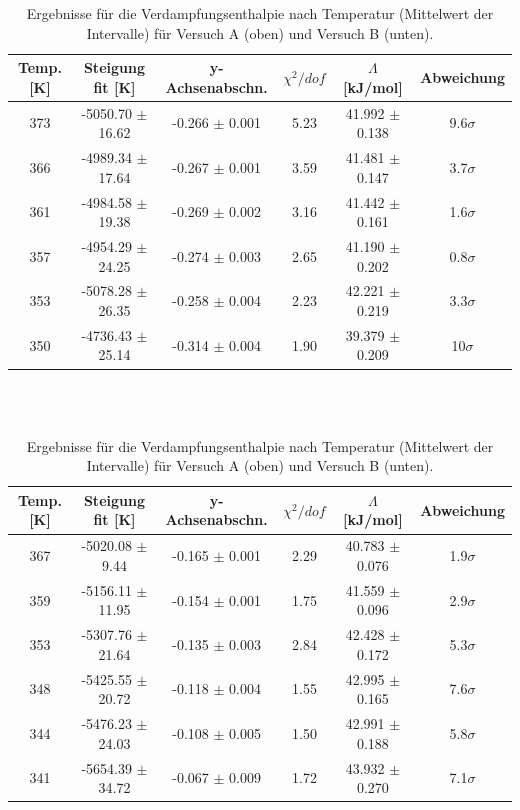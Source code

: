 \documentclass[12pt,a4paper]{article}
\begin{document}
\begin{table}[H]
	\begin{tabular}{|c|c|c|c|c|c|}
		\hline
		\textbf{Temp. [K]} & \textbf{Steigung fit [K]} & \textbf{y-Achsenabschn.} & $\chi ^2/dof$ & \textbf{$\Lambda$ [kJ/mol]} & \textbf{Abweichung} \\
		\hline
		373 & -5050.70 $\pm$ 16.62 & -0.266 $\pm$ 0.001 & 5.23 & 41.992 $\pm$ 0.138 & 9.6$\sigma$ \\
		\hline
		366 & -4989.34 $\pm$ 17.64 & -0.267 $\pm$ 0.001 & 3.59 & 41.481 $\pm$ 0.147 & 3.7$\sigma$ \\
		\hline
		361 & -4984.58 $\pm$ 19.38 & -0.269 $\pm$ 0.002 & 3.16 & 41.442 $\pm$ 0.161 & 1.6$\sigma$ \\
		\hline
		357 & -4954.29 $\pm$ 24.25 & -0.274 $\pm$ 0.003 & 2.65 & 41.190 $\pm$ 0.202 & 0.8$\sigma$ \\
		\hline
		353 & -5078.28 $\pm$ 26.35 & -0.258 $\pm$ 0.004 & 2.23 & 42.221 $\pm$ 0.219 & 3.3$\sigma$ \\
		\hline
		350 & -4736.43 $\pm$ 25.14 & -0.314 $\pm$ 0.004 & 1.90 & 39.379 $\pm$ 0.209 & 10$\sigma$ \\
		\hline 
	\end{tabular}\\		
\\

	\begin{tabular}{|c|c|c|c|c|c|}
		\hline
		\textbf{Temp. [K]} & \textbf{Steigung fit [K]} & \textbf{y-Achsenabschn.} & $\chi ^2/dof$ & \textbf{$\Lambda$ [kJ/mol]} & \textbf{Abweichung} \\
		\hline
		367 & -5020.08 $\pm$ 9.44 & -0.165 $\pm$ 0.001 & 2.29 & 40.783 $\pm$ 0.076 & 1.9$\sigma$ \\
		\hline
		359 & -5156.11 $\pm$ 11.95 & -0.154 $\pm$ 0.001 & 1.75 & 41.559 $\pm$ 0.096 & 2.9$\sigma$ \\
		\hline
		353 & -5307.76 $\pm$ 21.64 & -0.135 $\pm$ 0.003 & 2.84 & 42.428 $\pm$ 0.172 & 5.3$\sigma$ \\
		\hline
		348 & -5425.55 $\pm$ 20.72 & -0.118 $\pm$ 0.004 & 1.55 & 42.995 $\pm$ 0.165 & 7.6$\sigma$ \\
		\hline
		344 & -5476.23 $\pm$ 24.03 & -0.108 $\pm$ 0.005 & 1.50 & 42.991 $\pm$ 0.188 & 5.8$\sigma$ \\
		\hline
		341 & -5654.39 $\pm$ 34.72 & -0.067 $\pm$ 0.009 & 1.72 & 43.932 $\pm$ 0.270 & 7.1$\sigma$ \\
		\hline
	\end{tabular}



	\caption{Ergebnisse für die Verdampfungsenthalpie nach Temperatur (Mittelwert der Intervalle) für Versuch A (oben) und Versuch B (unten).}
	\label{tab:enthalpie_A}
\end{table}
\end{document}
